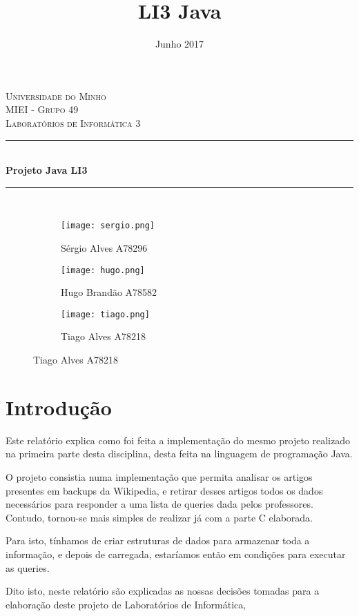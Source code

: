\documentclass{article}
\title{LI3 Java}
\date{Junho 2017}
\begin{document}
 	\begin{titlepage}

\newcommand{\HRule}{\rule{\linewidth}{0.5mm}} %

\center %

\textsc{\LARGE Universidade do Minho}\\[1.5cm] %
\textsc{\Large MIEI - Grupo 49}\\[0.5cm] %
\textsc{\large Laboratórios de Informática 3}\\[0.5cm] %

\HRule \\[0.4cm]
{ \huge \bfseries Projeto Java LI3}\\[0.4cm] %
\HRule \\[1.5cm]

\begin{figure}[!htb]
\centering
\begin{subfigure}{.5\textwidth}
  \centering
  \texttt{[image: sergio.png]}
  \caption{Sérgio Alves A78296}
  \label{fig:sub6}
\end{subfigure}%
\begin{subfigure}{.5\textwidth}
  \centering
  \texttt{[image: hugo.png]}
  \caption{Hugo Brandão A78582}
  \label{fig:sub7}
\end{subfigure}
\begin{subfigure}{.5\textwidth}
  \centering
  \texttt{[image: tiago.png]}
  \caption{Tiago Alves A78218}
  \label{fig:sub8}
\end{subfigure}
\label{fig:test3}
\end{figure}

	\end{titlepage}

\tableofcontents

\pagebreak

\section{Introdução}
\par Este relatório explica como foi feita a implementação do mesmo projeto realizado na primeira parte desta disciplina, desta feita na linguagem de programação Java.
\par O projeto consistia numa implementação que permita analisar os artigos presentes em backups da Wikipedia, e retirar desses artigos todos os dados necessários para responder a uma lista de queries dada pelos professores. Contudo, tornou-se mais simples de realizar já com a parte C elaborada.
\par Para isto, tínhamos de criar estruturas de dados para armazenar toda a informação, e depois de carregada, estaríamos então em condições para executar as queries.
\par Dito isto, neste relatório são explicadas as nossas decisões tomadas para a elaboração deste projeto de Laboratórios de Informática,
\end{document}
